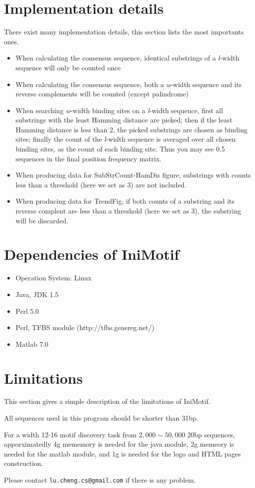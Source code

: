 \documentclass[a4paper,10pt]{article}
\begin{document}
\section{Implementation details}
There exist many implementation details, this section lists the most importants ones.
\begin{itemize}
 \item When calculating the consensus sequence, identical substrings of a \textit{l}-width sequence will only be counted once
 \item When calculating the consensus sequence, both a \textit{w}-width sequence and its reverse complements will be counted (except palindrome)
 \item When searching \textit{w}-width binding sites on a \textit{l}-width sequence, first all substrings with the least Hamming distance are picked; then if the least Hamming distance is less than 2, the picked substrings are chosen as binding sites; finally the count of the \textit{l}-width sequence is averaged over all chosen binding sites, as the count of each binding site. Thus you may see 0.5 sequences in the final position frequency matrix.
 \item When producing data for SubStrCount-HamDis figure, substrings with counts less than a threshold (here we set as 3) are not included.
 \item When producing data for TrendFig, if both counts of a substring and its reverse complent are less than a threshold (here we set as 3), the substring will be discarded.
\end{itemize}



\section{Dependencies of IniMotif}
\begin{itemize}
 \item Operation System: Linux
 \item Java, JDK 1.5
 \item Perl 5.0
 \item Perl, TFBS module (http://tfbs.genereg.net/)
 \item Matlab 7.0
\end{itemize}



\section{Limitations}
This section gives a simple description of the limitations of IniMotif.

All sequences used in this program should be shorter than 31bp.

For a width 12-16 motif discovery task from $2,000\sim50,000$ 20bp sequences, 
apporximatedly 4g mememory is needed for the java module, 
2g memeory is needed for the matlab module, 
and 1g is needed for the logo and HTML pages construction.

Please contact \texttt{lu.cheng.cs@gmail.com} if there is any problem.
\end{document}
